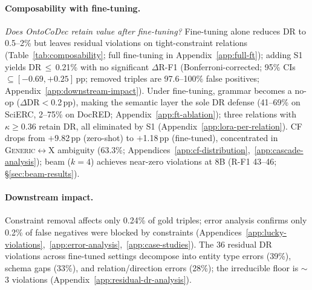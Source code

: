 \paragraph{Composability with fine-tuning.}
\label{sec:composability}
\emph{Does OntoCoDec retain value after fine-tuning?}
Fine-tuning alone reduces DR to 0.5--2\% but leaves residual violations on tight-constraint relations (Table~\ref{tab:composability}; full fine-tuning in Appendix~\ref{app:full-ft}); adding S1 yields DR\,$\leq$\,0.21\% with no significant $\Delta$R-F1 (Bonferroni-corrected; 95\% CIs $\subseteq [-0.69, {+}0.25]$\,pp; removed triples are 97.6--100\% false positives; Appendix~\ref{app:downstream-impact}).
Under fine-tuning, grammar becomes a no-op ($\Delta$DR$<$0.2\,pp), making the semantic layer the sole DR defense (41--69\% on SciERC, 2--75\% on DocRED; Appendix~\ref{app:ft-ablation}); three relations with $\kappa \geq 0.36$ retain DR, all eliminated by S1 (Appendix~\ref{app:lora-per-relation}).
CF drops from $+$9.82\,pp (zero-shot) to $+$1.18\,pp (fine-tuned), concentrated in \textsc{Generic}$\leftrightarrow$X ambiguity (63.3\%; Appendices~\ref{app:cf-distribution},~\ref{app:cascade-analysis}); beam ($k{=}4$) achieves near-zero violations at 8B (R-F1 43--46; \S\ref{sec:beam-results}).


\paragraph{Downstream impact.}
\label{sec:downstream-impact}
Constraint removal affects only 0.24\% of gold triples; error analysis confirms only 0.2\% of false negatives were blocked by constraints (Appendices~\ref{app:lucky-violations},~\ref{app:error-analysis},~\ref{app:case-studies}).
The 36 residual DR violations across fine-tuned settings decompose into entity type errors (39\%), schema gaps (33\%), and relation/direction errors (28\%); the irreducible floor is $\sim$3 violations (Appendix~\ref{app:residual-dr-analysis}).
